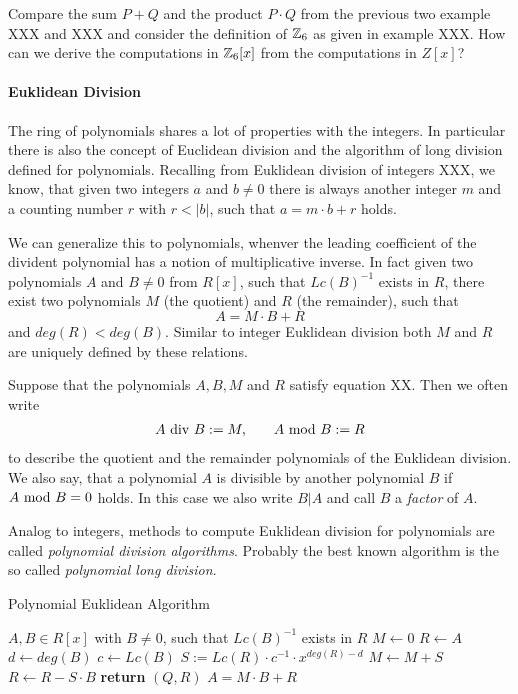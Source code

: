 \begin{exercise}
Compare the sum $P+Q$ and the product $P\cdot Q$ from the previous two example XXX and XXX and consider the definition of $\mathbb{Z}_6$ as given in example XXX. How can we derive the computations in $\mathbb{Z}_6[x]$ from the computations in $Z[x]$? 
\end{exercise}
\paragraph{Euklidean Division}
The ring of polynomials shares a lot of properties with the integers. In particular there is also the concept of Euclidean division and the algorithm of long division defined for polynomials. Recalling from Euklidean division of integers XXX, we know, that given two integers $a$ and $b\neq 0$ there is always another integer $m$ and a counting number $r$ with $r<|b|$, such that $a = m\cdot b +r$ holds.

We can generalize this to polynomials, whenver the leading coefficient of the divident polynomial has a notion of multiplicative inverse. In fact given two polynomials $A$ and $B\neq 0$ from $R[x]$, such that $Lc(B)^{-1}$ exists in $R$, there exist two polynomials $M$ (the quotient) and $R$ (the remainder), such that
\begin{equation}
A = M\cdot B + R
\end{equation}
and $deg(R) < deg(B)$. Similar to integer Euklidean division both $M$ and $R$ are uniquely defined by these relations. 
\begin{notation}
\label{eq_polynomial_euklidean_division_notation}
Suppose that the polynomials $ A, B, M $ and $ R $ satisfy equation XX. Then we often write 
\begin{equation}
\label{def_integer_division_and_modulus}
\begin{array}{lcr}
A \text{ div } B: = M, & & A \text{ mod } B: = R 
\end{array}
\end{equation}
to describe the quotient and the remainder polynomials of the Euklidean division. We also say, that a polynomial $ A $ is divisible by another polynomial $ B $ if $ A \text{ mod } B = 0 $ holds. In this case we also write $ B | A $ and call $B$ a \textit{factor} of $A$.
\end{notation}
Analog to integers, methods to compute Euklidean division for polynomials are called \textit{polynomial division algorithms}. Probably the best known algorithm is the so called \textit{polynomial long division}. 
\begin{algorithm}\caption{Polynomial Euklidean Algorithm}
\label{alg_ext_euclid_alg}
\begin{algorithmic}[0]
\Require $A,B \in R[x]$ with $B\neq 0$, such that $Lc(B)^{-1}$ exists in $R$
\State $M \gets 0$
\State $R \gets A$
\State $d \gets deg(B)$
\State $c \gets Lc(B)$
\State  $S := Lc(R)\cdot c^{-1}\cdot x^{deg(R)-d}$
\State $M \gets M + S$
\State $R \gets R - S\cdot B$
\EndWhile
\State \textbf{return} $(Q, R)$ 
\EndProcedure
\Ensure $ A=  M \cdot B + R$
\end{algorithmic}
\end{algorithm}


